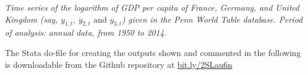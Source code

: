 \textit{Time series of the logarithm of GDP per capita of France, Germany, and United Kingdom (say, $y_{1,t},\ y_{2,t}\text{ and }y_{3,t}$) given in the Penn World Table database. Period of analysis: annual data, from 1950 to 2014.}

The Stata do-file for creating the outputs shown and commented in the following is downloadable from the Github repository at \href{https://raw.githubusercontent.com/thornoe/ub/master/Macroeconometrics/PS2/stata_code/do_PS_2.do}{bit.ly/2SLau6n}
